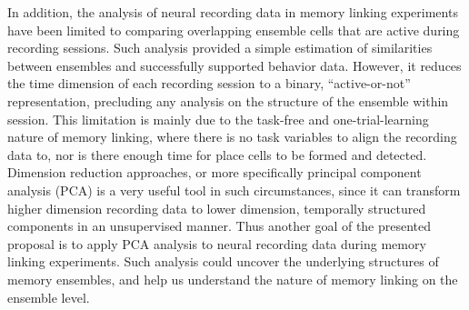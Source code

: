 \documentclass[master.tex]{subfiles}
\begin{document}
In addition, the analysis of neural recording data in memory linking experiments
have been limited to comparing overlapping ensemble cells that are active during
recording sessions. Such analysis provided a simple estimation of
similarities between ensembles and successfully supported behavior data.
However, it reduces the time dimension of each recording session to a binary,
``active-or-not'' representation, precluding any analysis on the structure of
the ensemble within session. This limitation is mainly due to the task-free and
one-trial-learning nature of memory linking, where there is no task
variables to align the recording data to, nor is there enough time for place
cells to be formed and detected. Dimension reduction approaches, or more
specifically principal component analysis (PCA) is a very useful tool in such
circumstances, since it can transform higher dimension recording data to lower
dimension, temporally structured components in an unsupervised manner. Thus
another goal of the presented proposal is to apply PCA analysis to neural
recording data during memory linking experiments. Such analysis could uncover
the underlying structures of memory ensembles, and help us understand the nature
of memory linking on the ensemble level.
\end{document}
